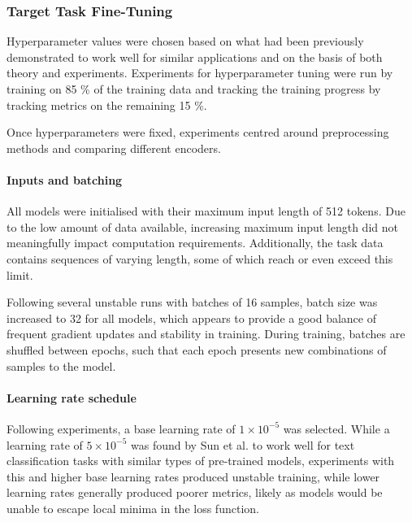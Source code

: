 \documentclass[12pt]{report}
\begin{document}
\subsubsection{Target Task Fine-Tuning}
Hyperparameter values were chosen based on what had been previously demonstrated to work well for similar applications and on the basis of both theory and experiments.
Experiments for hyperparameter tuning were run by training on 85 \% of the training data and tracking the training progress by tracking metrics on the remaining 15 \%.

Once hyperparameters were fixed, experiments centred around preprocessing methods and comparing different encoders.

\paragraph*{Inputs and batching}
All models were initialised with their maximum input length of 512 tokens.
Due to the low amount of data available, increasing maximum input length did not meaningfully impact computation requirements.
Additionally, the task data contains sequences of varying length, some of which reach or even exceed this limit.

Following several unstable runs with batches of 16 samples, batch size was increased to 32 for all models, which appears to provide a good balance of frequent gradient updates and stability in training.
During training, batches are shuffled between epochs, such that each epoch presents new combinations of samples to the model.

\paragraph*{Learning rate schedule}
Following experiments, a base learning rate of $1 \times 10^{-5}$ was selected.
While a learning rate of $5 \times 10^{-5}$ was found by Sun et al. \citeyear{Sun2020} to work well for text classification tasks with similar types of pre-trained models, experiments with this and higher base learning rates produced unstable training, while lower learning rates generally produced poorer metrics, likely as models would be unable to escape local minima in the loss function.
\end{document}
